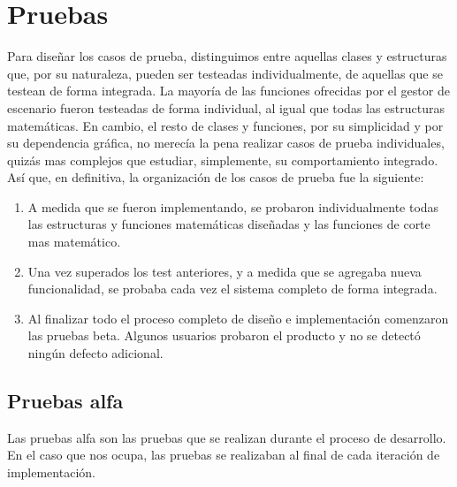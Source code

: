 %


\section{Pruebas}
\label{sec:pruebas}

Para diseñar los casos de prueba, distinguimos entre aquellas clases y
estructuras que, por su naturaleza, pueden ser testeadas
individualmente, de aquellas que se testean de forma integrada. La
mayoría de las funciones ofrecidas por el gestor de escenario fueron
testeadas de forma individual, al igual que todas las
estructuras matemáticas. En cambio, el resto de clases y funciones,
por su simplicidad y por su dependencia gráfica, no merecía la pena
realizar casos de prueba individuales, quizás mas complejos que
estudiar, simplemente, su comportamiento integrado. Así que, en
definitiva, la organización de los casos de prueba fue la siguiente:

\begin{enumerate}
\item A medida que se fueron implementando, se probaron
  individualmente todas las estructuras y funciones matemáticas
  diseñadas y las funciones de corte mas matemático.
\item Una vez superados los test anteriores, y a medida que se
  agregaba nueva funcionalidad, se probaba cada vez el sistema
  completo de forma integrada.
\item Al finalizar todo el proceso completo de diseño e implementación
  comenzaron las pruebas beta. Algunos usuarios probaron el producto y
  no se detectó ningún defecto adicional.
\end{enumerate}

\subsection{Pruebas alfa}
Las pruebas alfa son las pruebas que se realizan durante el proceso de
desarrollo. En el caso que nos ocupa, las pruebas se realizaban al
final de cada iteración de implementación.

